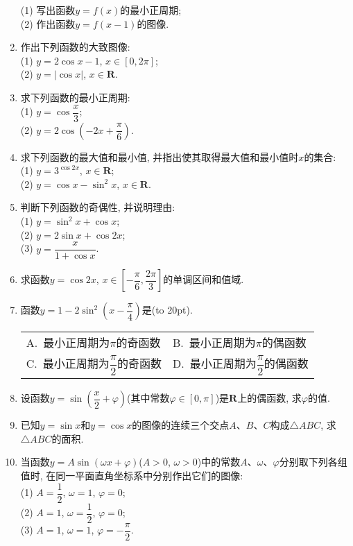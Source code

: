 \documentclass[10pt,a4paper]{article}
\newcommand{\bracket}[1]{(\hbox to #1pt{})}
\newcommand{\twoch}[4]{\par\begin{tabular}{p{.46\textwidth}p{.46\textwidth}}
A.~#1& B.~#2\\
C.~#3& D.~#4
\end{tabular}}
\begin{document}
\begin{enumerate}[1.]
\begin{center}
\end{center}
(1) 写出函数$y=f(x)$的最小正周期;\\
(2) 作出函数$y=f(x-1)$的图像.
\item 作出下列函数的大致图像:\\
(1) $y=2\cos x-1$, $x\in [0, 2\pi ]$;\\
(2) $y=|\cos x|$, $x\in \mathbf{R}$.
\item 求下列函数的最小正周期:\\
(1) $y=\cos \dfrac x3$;\\
(2) $y=2\cos (-2x+\dfrac \pi 6)$.
\item 求下列函数的最大值和最小值, 并指出使其取得最大值和最小值时$x$的集合:\\
(1) $y=3^{\cos 2x}$, $x\in \mathbf{R}$;\\
(2) $y=\cos x-\sin^2x$, $x\in \mathbf{R}$.
\item 判断下列函数的奇偶性, 并说明理由:\\
(1) $y=\sin^2x+\cos x$;\\
(2) $y=2\sin x+\cos 2x$;\\
(3) $y=\dfrac x{1+\cos x}$.
\item 求函数$y=\cos 2x$, $x\in [-\dfrac \pi 6, \dfrac{2\pi} 3]$的单调区间和值域.
\item 函数$y=1-2\sin^2(x-\dfrac \pi 4)$是\bracket{20}.
\twoch{最小正周期为$\pi$的奇函数}{最小正周期为$\pi$的偶函数}{最小正周期为$\dfrac \pi 2$的奇函数}{最小正周期为$\dfrac \pi 2$的偶函数}
\item 设函数$y=\sin (\dfrac x2+\varphi)$(其中常数$\varphi \in [0, \pi ]$)是$\mathbf{R}$上的偶函数, 求$\varphi$的值.
\item 已知$y=\sin x$和$y=\cos x$的图像的连续三个交点$A$、$B$、$C$构成$\triangle ABC$, 求$\triangle ABC$的面积.
\item 当函数$y=A\sin (\omega x+\varphi)$($A>0$, $\omega >0$)中的常数$A$、$\omega$、$\varphi$分别取下列各组值时, 在同一平面直角坐标系中分别作出它们的图像:\\
(1) $A=\dfrac 12$, $\omega =1$, $\varphi =0$;\\
(2) $A=1$, $\omega =\dfrac 12$, $\varphi =0$;\\
(3) $A=1$, $\omega =1$, $\varphi =-\dfrac \pi 2$.

\end{enumerate}
\end{document}
